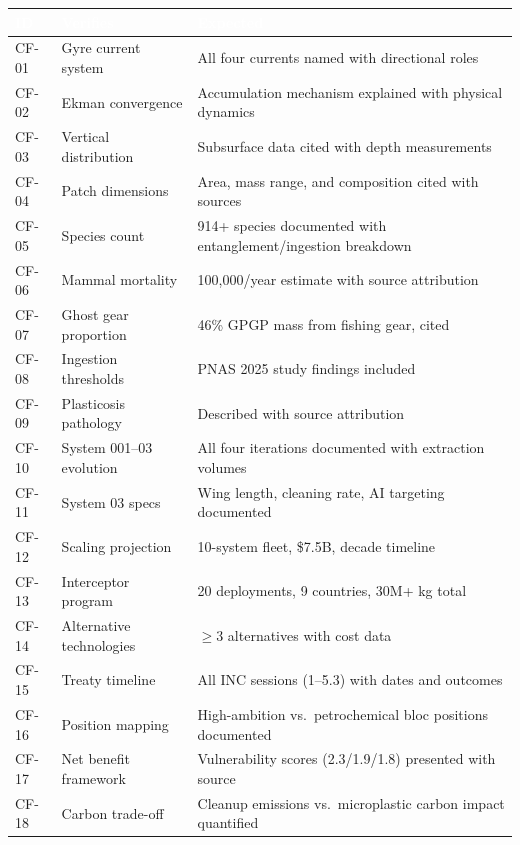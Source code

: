 \documentclass[11pt,letterpaper]{article}
\newcommand{\tableheader}[1]{\textbf{\sffamily\textcolor{white}{#1}}}
\begin{document}
\begin{center}
\small
\begin{tabularx}{\textwidth}{C{1.2cm}L{2.5cm}X}
\toprule
{}
\tableheader{ID} & \tableheader{Verifies} & \tableheader{Expected} \\
\midrule
CF-01 & Gyre current system & All four currents named with directional roles \\
CF-02 & Ekman convergence & Accumulation mechanism explained with physical dynamics \\
CF-03 & Vertical distribution & Subsurface data cited with depth measurements \\
CF-04 & Patch dimensions & Area, mass range, and composition cited with sources \\
CF-05 & Species count & 914+ species documented with entanglement/ingestion breakdown \\
CF-06 & Mammal mortality & 100,000/year estimate with source attribution \\
CF-07 & Ghost gear proportion & 46\% GPGP mass from fishing gear, cited \\
CF-08 & Ingestion thresholds & PNAS 2025 study findings included \\
CF-09 & Plasticosis pathology & Described with source attribution \\
CF-10 & System 001--03 evolution & All four iterations documented with extraction volumes \\
CF-11 & System 03 specs & Wing length, cleaning rate, AI targeting documented \\
CF-12 & Scaling projection & 10-system fleet, \$7.5B, decade timeline \\
CF-13 & Interceptor program & 20 deployments, 9 countries, 30M+ kg total \\
CF-14 & Alternative technologies & $\geq$3 alternatives with cost data \\
CF-15 & Treaty timeline & All INC sessions (1--5.3) with dates and outcomes \\
CF-16 & Position mapping & High-ambition vs.\ petrochemical bloc positions documented \\
CF-17 & Net benefit framework & Vulnerability scores (2.3/1.9/1.8) presented with source \\
CF-18 & Carbon trade-off & Cleanup emissions vs.\ microplastic carbon impact quantified \\
\bottomrule
\end{tabularx}
\end{center}
\end{document}

